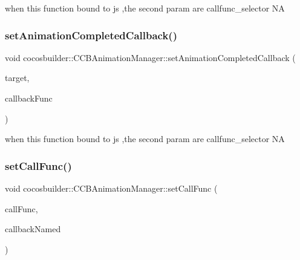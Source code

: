 when this function bound to js ,the second param are callfunc\+\_\+selector  NA \mbox{\label{classcocosbuilder_1_1CCBAnimationManager_a52729b235eae531b6b4607ca1dca80ab}} 
\subsubsection{\texorpdfstring{set\+Animation\+Completed\+Callback()}{setAnimationCompletedCallback()}\hspace{0.1cm}{\footnotesize\ttfamily [2/2]}}
{\footnotesize\ttfamily void cocosbuilder\+::\+C\+C\+B\+Animation\+Manager\+::set\+Animation\+Completed\+Callback (\begin{DoxyParamCaption}\item[{cocos2d\+::\+Ref $\ast$}]{target,  }\item[{cocos2d\+::\+S\+E\+L\+\_\+\+Call\+Func}]{callback\+Func }\end{DoxyParamCaption})}

when this function bound to js ,the second param are callfunc\+\_\+selector  NA \mbox{\label{classcocosbuilder_1_1CCBAnimationManager_a98a96e47cd517ea03ed009c4c4d640e4}} 
\subsubsection{\texorpdfstring{set\+Call\+Func()}{setCallFunc()}\hspace{0.1cm}{\footnotesize\ttfamily [1/2]}}
{\footnotesize\ttfamily void cocosbuilder\+::\+C\+C\+B\+Animation\+Manager\+::set\+Call\+Func (\begin{DoxyParamCaption}\item[{cocos2d\+::\+Call\+Func $\ast$}]{call\+Func,  }\item[{const std\+::string \&}]{callback\+Named }\end{DoxyParamCaption})}


